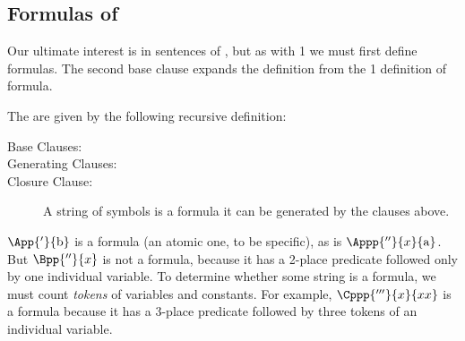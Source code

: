 \subsection{Formulas of \GQL{}}\label{Formulas of GQL}
Our ultimate interest is in sentences of \GQL{}, but as with \GQL{}1 we must first define formulas. The second base clause expands the definition from the \GQL{}1 definition of formula.
\begin{majorILnc}{} The   are given by the following recursive definition:
\begin{description}
\item[Base Clauses:] \hfill{}
\item[Generating Clauses:] \hfill{}
\item[Closure Clause:] A string of symbols is a formula \Iff it can be generated by the clauses above.
\end{description}
\end{majorILnc}
\noindent{}$\App{'}{\constant{b}}$ is a formula (an atomic one, to be specific), as is $\Appp{''}{\variable{x}}{\constant{a}}$. 
But $\Bpp{''}{\variable{x}}$ is not a formula, because it has a 2-place predicate followed only by one individual variable. 
To determine whether some string is a formula, we must count \emph{tokens} of variables and constants. 
For example, $\Cppp{'''}{\variable{x}}{\variable{x}\variable{x}}$ is a formula because it has a 3-place predicate followed by three tokens of an individual variable.

